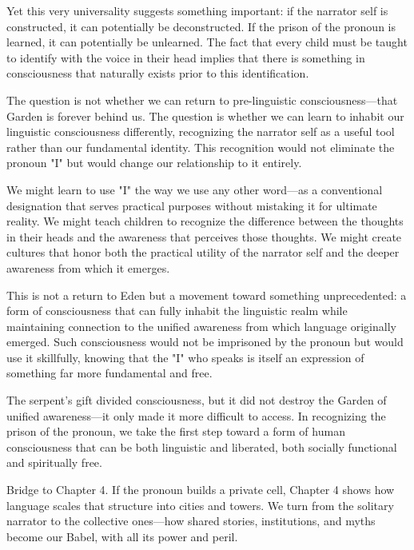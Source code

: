 Yet this very universality suggests something important: if the narrator self is constructed, it can potentially be deconstructed. If the prison of the pronoun is learned, it can potentially be unlearned. The fact that every child must be taught to identify with the voice in their head implies that there is something in consciousness that naturally exists prior to this identification.

The question is not whether we can return to pre-linguistic consciousness—that Garden is forever behind us. The question is whether we can learn to inhabit our linguistic consciousness differently, recognizing the narrator self as a useful tool rather than our fundamental identity. This recognition would not eliminate the pronoun "I" but would change our relationship to it entirely.

We might learn to use "I" the way we use any other word—as a conventional designation that serves practical purposes without mistaking it for ultimate reality. We might teach children to recognize the difference between the thoughts in their heads and the awareness that perceives those thoughts. We might create cultures that honor both the practical utility of the narrator self and the deeper awareness from which it emerges.

This is not a return to Eden but a movement toward something unprecedented: a form of consciousness that can fully inhabit the linguistic realm while maintaining connection to the unified awareness from which language originally emerged. Such consciousness would not be imprisoned by the pronoun but would use it skillfully, knowing that the "I" who speaks is itself an expression of something far more fundamental and free.

The serpent's gift divided consciousness, but it did not destroy the Garden of unified awareness—it only made it more difficult to access. In recognizing the prison of the pronoun, we take the first step toward a form of human consciousness that can be both linguistic and liberated, both socially functional and spiritually free.

\bigskip
\noindent Bridge to Chapter 4. If the pronoun builds a private cell, Chapter 4 shows how language scales that structure into cities and towers. We turn from the solitary narrator to the collective ones—how shared stories, institutions, and myths become our Babel, with all its power and peril.

